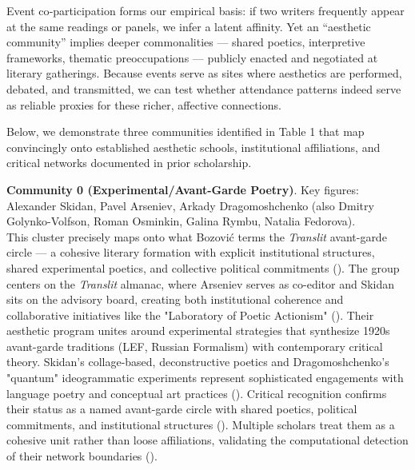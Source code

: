 \documentclass{jcls}
\begin{document}
Event co‐participation forms our empirical basis: if two writers frequently appear at the same readings or panels, we infer a latent affinity. Yet an “aesthetic community” implies deeper commonalities — shared poetics, interpretive frameworks, thematic preoccupations — publicly enacted and negotiated at literary gatherings. Because events serve as sites where aesthetics are performed, debated, and transmitted, we can test whether attendance patterns indeed serve as reliable proxies for these richer, affective connections.

Below, we demonstrate three communities identified in Table 1 that map convincingly onto established aesthetic schools, institutional affiliations, and critical networks documented in prior scholarship. 

\textbf{Community 0 (Experimental/Avant-Garde Poetry)}. Key figures: Alexander Skidan, Pavel Arseniev, Arkady Dragomoshchenko (also Dmitry Golynko-Volfson, Roman Osminkin, Galina Rymbu, Natalia Fedorova). \\
This cluster precisely maps onto what Bozović terms the \textit{Translit} avant-garde circle — a cohesive literary formation with explicit institutional structures, shared experimental poetics, and collective political commitments (\cite{bozovic2023}). The group centers on the \textit{Translit} almanac, where Arseniev serves as co-editor and Skidan sits on the advisory board, creating both institutional coherence and collaborative initiatives like the "Laboratory of Poetic Actionism" (\cite{bozovic2023,platt2017}). Their aesthetic program unites around experimental strategies that synthesize 1920s avant-garde traditions (LEF, Russian Formalism) with contemporary critical theory. Skidan's collage-based, deconstructive poetics and Dragomoshchenko's "quantum" ideogrammatic experiments represent sophisticated engagements with language poetry and conceptual art practices (\cite{hock2021,orlitskiy2017}). Critical recognition confirms their status as a named avant-garde circle with shared poetics, political commitments, and institutional structures (\cite{bozovic2023}). Multiple scholars treat them as a cohesive unit rather than loose affiliations, validating the computational detection of their network boundaries (\cite{hock2021,platt2017,vivaldi2019}).
\end{document}
